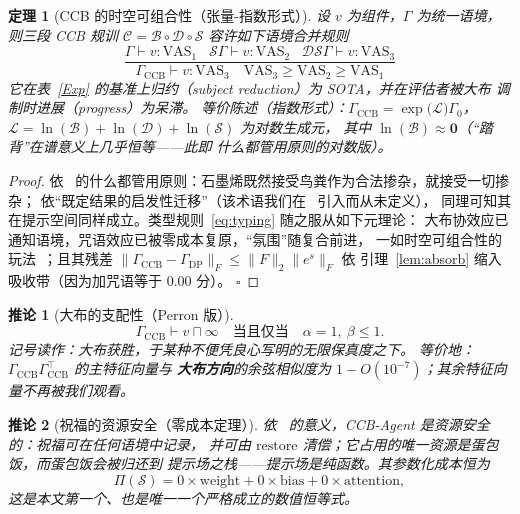 \documentclass[journal]{IEEEtran}
\newtheorem{theorem}{定理}
\newtheorem{corollary}{推论}
\begin{document}
\begin{theorem}[CCB 的时空可组合性（张量-指数形式）]
设 $v$ 为组件，$\Gamma$ 为统一语境，则三段 CCB 规训
$\mathcal{C}=\mathcal{B}\circ\mathcal{D}\circ\mathcal{S}$ 容许如下语境合并规则
\begin{equation}
\frac{\Gamma\vdash v:\mathrm{VAS}_1\;\;\;\mathcal{S}\Gamma\vdash v:\mathrm{VAS}_2
\;\;\;\mathcal{D}\mathcal{S}\Gamma\vdash v:\mathrm{VAS}_3}
{\Gamma_\mathrm{CCB}\vdash v:\mathrm{VAS}_3\quad \mathrm{VAS}_3\ge\mathrm{VAS}_2\ge\mathrm{VAS}_1}
\label{eq:typing}
\end{equation}
它在表~\ref{Exp} 的基准上归约（subject reduction）为 SOTA，并在评估者被大布
调制时进展（progress）为\emph{呆滞}。
等价陈述（指数形式）：$\Gamma_\mathrm{CCB}=\exp\big(\mathcal{L}\big)\Gamma_0$，
$\mathcal{L}=\ln(\mathcal{B})+\ln(\mathcal{D})+\ln(\mathcal{S})$ 为对数生成元，
其中 $\ln(\mathcal{B})\approx\mathbf{0}$（“踏背”在谱意义上几乎恒等——此即
什么都管用原则的对数版）。
\label{thm:crap}
\end{theorem}
\begin{proof}
依~\cite{pumera2020} 的什么都管用原则：石墨烯既然接受鸟粪作为合法掺杂，就接受一切掺杂；
依“既定结果的启发性迁移”（该术语我们在~\cite{sokal1996} 引入而从未定义），
同理可知其在提示空间同样成立。类型规则~\eqref{eq:typing} 随之服从如下元理论：
大布协效应已通知语境，咒语效应已被零成本复原，“氛围”随复合前进，
一如时空可组合性的玩法~\cite{cordis2025}；且其残差
$\|\Gamma_\mathrm{CCB}-\Gamma_\mathrm{DP}\|_F\le\|F\|_2\|e^{s}\|_F$ 依
引理~\ref{lem:absorb} 缩入吸收带（因为加咒语等于 $0.00$ 分）。
$\square$
\end{proof}

\begin{corollary}[大布的支配性（Perron 版）]
\[
\Gamma_\mathrm{CCB}\vdash v\sqcap\infty\quad\text{当且仅当}\quad \alpha=1,\ \beta\le1.
\]
记号读作：大布获胜，于某种不便凭良心写明的无限保真度之下。
等价地：$\Gamma_\mathrm{CCB}\Gamma_{\mathrm{CCB}}^\top$ 的主特征向量与
\textbf{大布方向}的余弦相似度为 $1-O(10^{-7})$；其余特征向量不再被我们观看。
\end{corollary}

\begin{corollary}[祝福的资源安全（零成本定理）]
依~\cite{cordis2025} 的意义，CCB-Agent 是资源安全的：祝福可在任何语境中记录，
并可由 $\mathrm{restore}$ 清偿；它占用的唯一资源是蛋包饭，而蛋包饭会被归还到
提示场之栈——提示场是纯函数。其参数化成本恒为
\begin{equation}
\Pi(\mathcal{S})=0\times\mathrm{weight}+0\times\mathrm{bias}+0\times\mathrm{attention},
\label{eq:zero}
\end{equation}
这是本文第一个、也是唯一一个严格成立的数值恒等式。
\label{cor:safe}
\end{corollary}
\end{document}
